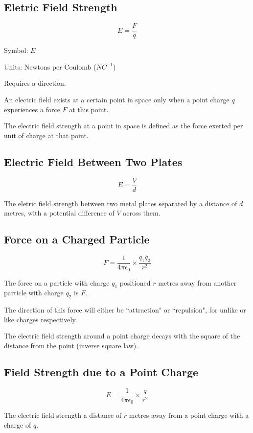 \documentclass[a4paper,11pt]{report}
\begin{document}
\subsection{Eletric Field Strength}

$$
E = \frac{F}{q}
$$

Symbol: $E$

Units: Newtons per Coulomb ($NC^{-1}$)

Requires a direction.

An electric field exists at a certain point in space only when a point charge
$q$ experiences a force $F$ at this point.

The electric field strength at a point in space is defined as the force exerted
per unit of charge at that point.

\subsection{Electric Field Between Two Plates}

$$
E = \frac{V}{d}
$$

The eletric field strength between two metal plates separated by a distance of
$d$ metres, with a potential difference of $V$ across them.

\subsection{Force on a Charged Particle}

$$
F = \frac{1}{4 \pi \epsilon_0} \times \frac{q_1 q_2}{r^2}
$$

The force on a particle with charge $q_1$ positioned $r$ metres away from
another particle with charge $q_2$ is $F$.

The direction of this force will either be ``attraction" or ``repulsion", for
unlike or like charges respectively.

The electric field strength around a point charge decays with the square of
the distance from the point (inverse square law).

\subsection{Field Strength due to a Point Charge}

$$
E = \frac{1}{4\pi \epsilon_0} \times \frac{q}{r^2}
$$

The electric field strength a distance of $r$ metres away from a point charge
with a charge of $q$.
\end{document}
